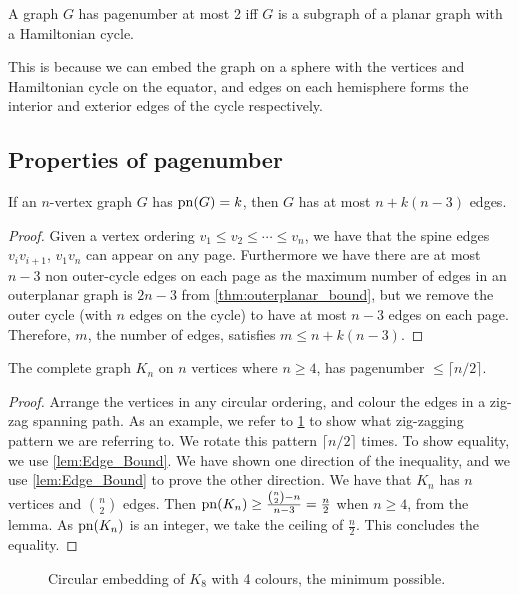 \begin{lemma}\label{lem:Pagenumber_2}
	A graph \(G\) has pagenumber at most 2 iff \(G\) is a subgraph of a planar graph with a Hamiltonian cycle.
\end{lemma}
This is because we can embed the graph on a sphere with the vertices and Hamiltonian cycle on the equator, and edges on each hemisphere forms the interior and exterior edges of the cycle respectively.
\subsection{Properties of pagenumber}\label{ssec:Related_Properties}
\begin{lemma}\label{lem:Edge_Bound}
	If an \(n\)-vertex graph \(G\) has \(\operatorname{pn}(G) = k\), then \(G\) has at most \(n + k(n-3)\) edges.
\end{lemma}
\begin{proof}
	Given a vertex ordering \(v_1 \leq v_2 \leq \cdots \leq v_n\), we have that the spine edges \(v_i v_{i + 1}\), \(v_1 v_n\)  can appear on any page. Furthermore we have there are at most \(n-3\) non outer-cycle edges on each page as the maximum number of edges in an outerplanar graph is \(2n - 3\) from \cref{thm:outerplanar_bound}, but we remove the outer cycle (with \(n\) edges on the cycle) to have at most \(n-3\) edges on each page. Therefore, \(m\), the number of edges, satisfies \(m \leq n + k (n - 3)\).
\end{proof}
\begin{theorem}\label{thm:Pagenumber_Complete_Graph}
	The complete graph \(K_n\) on \(n\) vertices where \(n \geq 4\), has pagenumber \( \leq \lceil n/2 \rceil \).
\end{theorem}
\begin{proof}
	Arrange the vertices in any circular ordering, and colour the edges in a zig-zag spanning path. As an example, we refer to \cref{fig:k8 coloured with colours} to show what zig-zagging pattern we are referring to. We rotate this pattern $\lceil n/2 \rceil$ times. To show equality, we use \cref{lem:Edge_Bound}.
	We have shown one direction of the inequality, and we use \cref{lem:Edge_Bound} to prove the other direction. We have that \(K_n\) has \(n\) vertices and \(\binom{n}{2}\) edges. Then \(\operatorname{pn}(K_n) \geq \frac{\binom{n}{2} - n}{n - 3} = \frac{n}{2}\) when \(n \geq 4\), from the lemma. As \(\operatorname{pn}(K_n)\) is an integer, we take the ceiling of \(\frac{n}{2}\). This concludes the equality.
\end{proof}
\begin{figure}[ht]
	\caption{Circular embedding of \(K_8\) with 4 colours, the minimum possible.}
	\centering
	
	\label{fig:k8 coloured with colours}
\end{figure}

